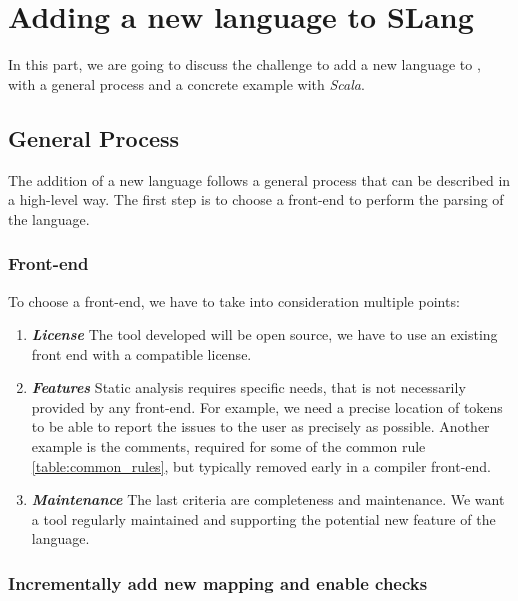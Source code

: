 \section{Adding a new language to SLang}
\label{sec:new_language}

In this part, we are going to discuss the challenge to add a new language to \slang{}, with a general process and a concrete example with \emph{Scala}.

\subsection{General Process}
\label{subsec:general_procedure}

The addition of a new language follows a general process that can be described in a high-level way.
The first step is to choose a front-end to perform the parsing of the language.

\subsubsection{Front-end}
\label{subsubsec:front_end}

To choose a front-end, we have to take into consideration multiple points:
\begin{enumerate}
	\item \textbf{\textit{License}} \newline The tool developed will be open source, we have to use an existing front end with a compatible license.
	\item \textbf{\textit{Features}} \newline Static analysis requires specific needs, that is not necessarily provided by any front-end.	
	For example, we need a precise location of tokens to be able to report the issues to the user as precisely as possible.
	Another example is the comments, required for some of the common rule \ref{table:common_rules}, but typically removed early in a compiler front-end.
	\item \textbf{\textit{Maintenance}} \newline 
	The last criteria are completeness and maintenance.
	We want a tool regularly maintained and supporting the potential new feature of the language. 
\end{enumerate}

\subsubsection{Incrementally add new mapping and enable checks}
\label{subsubsec:new_mapping_and_enables_rules}

